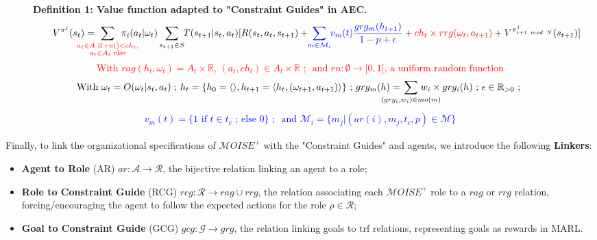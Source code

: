 \documentclass[sigconf,anonymous]{aamas}
\begin{document}
\begin{figure*}[h!]
  \label{eq:single_value_function}
  \raggedright
  \textbf{\quad Definition 1: Value function adapted to "Constraint Guides" in AEC.}
  \begin{gather*}
    \text{\quad \quad} V^{\pi^j}(s_t) = \hspace{-0.75cm} \sum_{\textcolor{red}{ \substack{a_{t} \in A \text{ if } rn() < ch_{t}, \\ 
    a_{t} \in A_{t} \text{ else}}
    }}{\hspace{-0.7cm} \pi_i(a_{t} | \omega_t)} \sum_{s_{t+1} \in S}{\hspace{-0.1cm} T(s_{t+1} | s_t, a_{t})[R(s_t,a_{t},s_{t+1}) + \hspace{-0.1cm} \textcolor{blue}{ \sum_{m \in \mathcal{M}_i}{ \hspace{-0.1cm} v_m(t) \frac{grg_m(h_{t+1})}{1 - p + \epsilon} } } + \textcolor{red}{ch_t \times rrg(\omega_t,a_{t+1})} + V^{\pi^j_{i+1 \ mod \ N}}(s_{t+1})]}
  \end{gather*}  
  \textcolor{red}{\[\text{With } rag(h_t, \omega_t) = A_{t} \times \mathbb{R} \text{, } (a_t, ch_{t}) \in A_{t} \times \mathbb{R} \text{ ; } \text{ and } rn: \emptyset \to [0,1[ \text{, a uniform random function}\]}
  \vspace{-0.5cm}
  \textcolor{blue}{
  \begin{gather*}
  \text{With } \omega_t = O(\omega_t | s_t, a_t) \text{ ; } h_t = \{h_0 = \langle \rangle, h_{t+1} = \langle h_t, (\omega_{t+1}, a_{t+1}) \rangle \} \text{ ; } grg_m(h) = \hspace{-0.8cm} \sum_{(grg_i,w_i) \in mo(m)}{\hspace{-0.8cm} w_i \times grg_i(h)} \text{ ; } \epsilon \in \mathbb{R}_{>0} \text{ ; }
  \end{gather*}
  }
  \vspace{-0.75cm}
  \textcolor{blue}{
  \begin{gather*}
  v_m(t) = \{ 1 \text{ if } t \in t_c \text{ ; else } 0 \} \text{ ; } \text{ and } \mathcal{M}_i = \{m_j | (ar(i),m_j,t_c,p) \in \mathcal{M}\}
  \end{gather*}
  }
  \vspace{-0.6cm}
  \end{figure*}

Finally, to link the organizational specifications of $\mathcal{M}OISE^+$ with the "Constraint Guides" and agents, we introduce the following \textbf{Linkers}:
\begin{itemize}
    \item \textbf{Agent to Role} (AR) \quad $ar: \mathcal{A} \to \mathcal{R}$, the bijective relation linking an agent to a role;
    \item \textbf{Role to Constraint Guide} (RCG) \quad $rcg: \mathcal{R} \rightarrow rag \cup rrg$, the relation associating each $\mathcal{M}OISE^+$ role to a $rag$ or $rrg$ relation, forcing/encouraging the agent to follow the expected actions for the role $\rho \in \mathcal{R}$;
    \item \textbf{Goal to Constraint Guide} (GCG) \quad $gcg: \mathcal{G} \rightarrow grg$, the relation linking goals to trf relations, representing goals as rewards in MARL.
\end{itemize}
\end{document}

